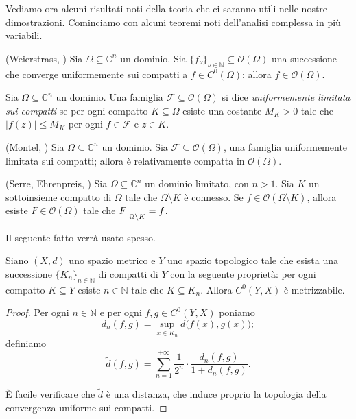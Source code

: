 Vediamo ora alcuni risultati noti della teoria che ci saranno utili nelle nostre dimostrazioni. Cominciamo con alcuni teoremi noti dell'analisi complessa in più variabili.

\begin{thm}
    (Weierstrass, \cite[Chapter 1, Proposition 5]{N}) Sia $\Omega \subseteq \mathbb{C}^n$ un dominio. Sia $\{f_{\nu}\}_{\nu\in\mathbb{N}} \subseteq \mathcal{O}(\Omega)$ una successione che converge uniformemente sui compatti a $f\in C^0(\Omega)$; allora $f\in\mathcal{O}(\Omega)$.
\end{thm}

\begin{defn}
    Sia $\Omega \subseteq \mathbb{C}^n$ un dominio. Una famiglia $\mathcal{F}\subseteq\mathcal{O}(\Omega)$ si dice \textit{uniformemente limitata sui compatti} se per ogni compatto $K\subseteq\Omega$ esiste una costante $M_K>0$ tale che $|f(z)|\le M_K$ per ogni $f\in\mathcal{F}$ e $z\in K$.
\end{defn}

\begin{thm}
    (Montel, \cite[Chapter 1, Proposition 6]{N}) Sia $\Omega \subseteq \mathbb{C}^n$ un dominio. Sia $\mathcal{F}\subseteq\mathcal{O}(\Omega)$, una famiglia uniformemente limitata sui compatti; allora è relativamente compatta in $\mathcal{O}(\Omega)$.
\end{thm}

\begin{thm} \label{hartogs_fen}
    (Serre, Ehrenpreis, \cite[Theorem 1.2.6]{Kr}) Sia $\Omega \subseteq \mathbb{C}^n$ un dominio limitato, con $n>1$. Sia $K$ un sottoinsieme compatto di $\Omega$ tale che $\Omega\setminus K$ è connesso. Se $f\in\mathcal{O}(\Omega\setminus K)$, allora esiste $F\in\mathcal{O}(\Omega)$ tale che $F\restrict{\Omega\setminus K}=f$.
\end{thm}

Il seguente fatto verrà usato spesso.

\begin{lm} \label{c0yx}
    Siano $(X,d)$ uno spazio metrico e $Y$ uno spazio topologico tale che esista una successione $\{K_n\}_{n\in\mathbb{N}}$ di compatti di $Y$ con la seguente proprietà: per ogni compatto $K\subseteq Y$ esiste $n\in\mathbb{N}$ tale che $K\subseteq K_n$. Allora $C^0(Y,X)$ è metrizzabile.
\end{lm}

\begin{proof}
    Per ogni $n\in\mathbb{N}$ e per ogni $f,g\in C^0(Y,X)$ poniamo
    $$d_n(f,g)=\displaystyle\sup_{x\in K_n} d\big(f(x),g(x)\big);$$
    definiamo
    $$\tilde{d}(f,g)=\sum_{n=1}^{+\infty} \frac{1}{2^n}\cdot\frac{d_n(f,g)}{1+d_n(f,g)}.$$

    È facile verificare che $\tilde{d}$ è una distanza, che induce proprio la topologia della convergenza uniforme sui compatti.
\end{proof}

